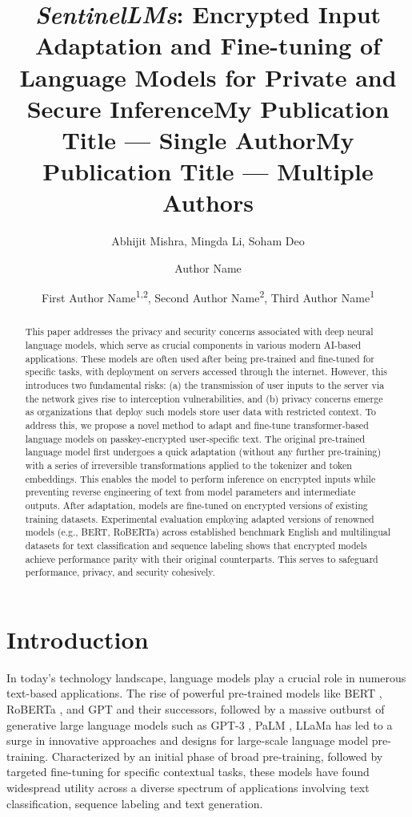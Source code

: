\documentclass[letterpaper]{article} %
\title{\emph{SentinelLMs}: Encrypted Input Adaptation and Fine-tuning of Language Models for Private and Secure Inference}
\author {
    Abhijit Mishra, Mingda Li, Soham Deo
}
\title{My Publication Title --- Single Author}
\author {
    Author Name
}
\title{My Publication Title --- Multiple Authors}
\author {
    First Author Name\textsuperscript{\rm 1,\rm 2},
    Second Author Name\textsuperscript{\rm 2},
    Third Author Name\textsuperscript{\rm 1}
}
\begin{document}
\maketitle

\begin{abstract}
This paper addresses the privacy and security concerns associated with deep neural language models, which serve as crucial components in various modern AI-based applications. These models are often used after being pre-trained and fine-tuned for specific tasks, with deployment on servers accessed through the internet. However, this introduces two fundamental risks: (a) the transmission of user inputs to the server via the network gives rise to interception vulnerabilities, and (b) privacy concerns emerge as organizations that deploy such models store user data with restricted context. To address this, we propose a novel method to adapt and fine-tune transformer-based language models on passkey-encrypted user-specific text. The original pre-trained language model first undergoes a quick adaptation (without any further pre-training) with a series of irreversible transformations applied to the tokenizer and token embeddings. This enables the model to perform inference on encrypted inputs while preventing reverse engineering of text from model parameters and intermediate outputs. After adaptation, models are fine-tuned on encrypted versions of existing training datasets. Experimental evaluation employing adapted versions of renowned models (e.g., BERT, RoBERTa) across established benchmark English and multilingual datasets for text classification and sequence labeling shows that encrypted models achieve performance parity with their original counterparts. This serves to safeguard performance, privacy, and security cohesively.
\end{abstract}

\section{Introduction}
In today's technology landscape, language models play a crucial role in numerous text-based applications. The rise of powerful pre-trained models like BERT \cite{devlin-etal-2019-bert}, RoBERTa \cite{liu2019roberta}, and GPT \cite{radford2018improving} and their successors, followed by a massive outburst of generative large language models such as GPT-3 \cite{brown2020language}, PaLM \cite{chowdhery2022palm}, LLaMa \cite{touvron2023llama} has led to a surge in innovative approaches and designs for large-scale language model pre-training. Characterized by an initial phase of broad pre-training, followed by targeted fine-tuning for specific contextual tasks, these models have found widespread utility across a diverse spectrum of applications \cite{otter2020survey,li2022pretrained} involving text classification, sequence labeling and text generation.
\end{document}
